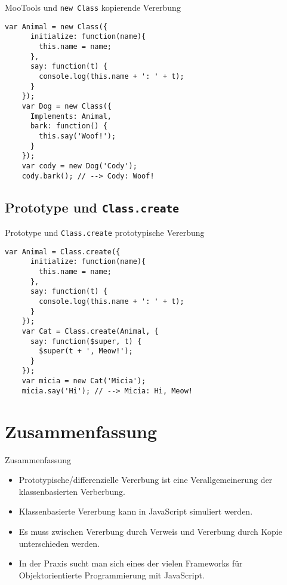 \begin{frame}[fragile]{MooTools und \texttt{new Class}}
    {kopierende Vererbung}
  \begin{lstlisting}[gobble=4]
    var Animal = new Class({
      initialize: function(name){
        this.name = name;
      },
      say: function(t) {
        console.log(this.name + ': ' + t);
      }
    });
    var Dog = new Class({
      Implements: Animal,
      bark: function() {
        this.say('Woof!');
      }
    });
    var cody = new Dog('Cody');
    cody.bark(); // --> Cody: Woof!
  \end{lstlisting}
\end{frame}

\subsection{Prototype und \texttt{Class.create}}

\begin{frame}[fragile]{Prototype und \texttt{Class.create}}
    {prototypische Vererbung}
  \begin{lstlisting}[gobble=4]
    var Animal = Class.create({
      initialize: function(name){
        this.name = name;
      },
      say: function(t) {
        console.log(this.name + ': ' + t);
      }
    });
    var Cat = Class.create(Animal, {
      say: function($super, t) {
        $super(t + ', Meow!');
      }
    });
    var micia = new Cat('Micia');
    micia.say('Hi'); // --> Micia: Hi, Meow!
  \end{lstlisting}
\end{frame}

\section*{Zusammenfassung}

\begin{frame}{Zusammenfassung}
  \begin{itemize}
    \item \alert{Prototypische/differenzielle Vererbung} ist eine \alert{Verallgemeinerung} der
      klassenbasierten Verberbung.
    \item \alert{Klassenbasierte Vererbung} kann in JavaScript \alert{simuliert} werden.
    \item Es muss zwischen \alert{Vererbung durch Verweis} und \alert{Vererbung durch
      Kopie} unterschieden werden.
    \item In der Praxis sucht man sich eines der \alert{vielen Frameworks} für
      \alert{Objektorientierte Programmierung mit JavaScript}.
  \end{itemize} 
\end{frame}


